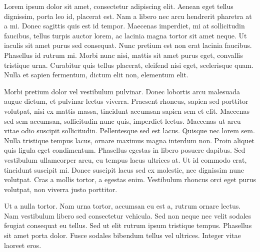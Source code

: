 Lorem ipsum dolor sit amet, consectetur adipiscing elit. Aenean eget tellus
dignissim, porta leo id, placerat est. Nam a libero nec arcu hendrerit pharetra
at a mi. Donec sagittis quis est id tempor. Maecenas imperdiet, mi at
sollicitudin faucibus, tellus turpis auctor lorem, ac lacinia magna tortor sit
amet neque. Ut iaculis sit amet purus sed consequat. Nunc pretium est non erat
lacinia faucibus. Phasellus id rutrum mi. Morbi nunc nisi, mattis sit amet
purus eget, convallis tristique urna. Curabitur quis tellus placerat, eleifend
nisi eget, scelerisque quam. Nulla et sapien fermentum, dictum elit non,
elementum elit.

Morbi pretium dolor vel vestibulum pulvinar. Donec lobortis arcu malesuada
augue dictum, et pulvinar lectus viverra. Praesent rhoncus, sapien sed
porttitor volutpat, nisi ex mattis massa, tincidunt accumsan sapien sem et
elit. Maecenas sed sem accumsan, sollicitudin nunc quis, imperdiet lectus.
Maecenas ut arcu vitae odio suscipit sollicitudin. Pellentesque sed est lacus.
Quisque nec lorem sem. Nulla tristique tempus lacus, ornare maximus magna
interdum non. Proin aliquet quis ligula eget condimentum. Phasellus egestas in
libero posuere dapibus. Sed vestibulum ullamcorper arcu, eu tempus lacus
ultrices at. Ut id commodo erat, tincidunt suscipit mi. Donec suscipit lacus
sed ex molestie, nec dignissim nunc volutpat. Cras a mollis tortor, a egestas
enim. Vestibulum rhoncus orci eget purus volutpat, non viverra justo porttitor.

Ut a nulla tortor. Nam urna tortor, accumsan eu est a, rutrum ornare lectus.
Nam vestibulum libero sed consectetur vehicula. Sed non neque nec velit sodales
feugiat consequat eu tellus. Sed ut elit rutrum ipsum tristique tempus.
Phasellus sit amet porta dolor. Fusce sodales bibendum tellus vel ultrices.
Integer vitae laoreet eros.
